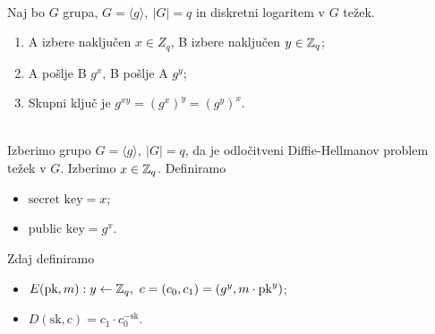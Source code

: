 \\
Naj bo \(G\) grupa, \(G = \langle g \rangle, \ |G| = q\) in diskretni logaritem v \(G\) težek.
\begin{enumerate}
    \item A izbere naključen \(x \in Z_q\), B izbere naključen \(y \in \mathbb{Z}_q\);
    \item A pošlje B \(g^x\), B pošlje A \(g^y\);
    \item Skupni ključ je \(g^{xy} = (g^x)^y = (g^y)^x\).
\end{enumerate}
\\
Izberimo grupo \(G = \langle g \rangle,\ |G| = q\), da je odločitveni Diffie-Hellmanov problem težek v \(G\). Izberimo \(x \in \mathbb{Z}_q\). Definiramo 
\begin{itemize}
    \item \(\text{secret key} = x\);
    \item \(\text{public key} = g^x\).
\end{itemize}
Zdaj definiramo 
\begin{itemize}
    \item \(E(\text{pk}, m): y \leftarrow \mathbb{Z}_q,\ c = (c_0, c_1) = (g^y, m \cdot \text{pk}^y)\);
    \item \(D(\text{sk}, c) = c_1 \cdot c_0^{-\text{sk}}\).
\end{itemize}
\newpage

